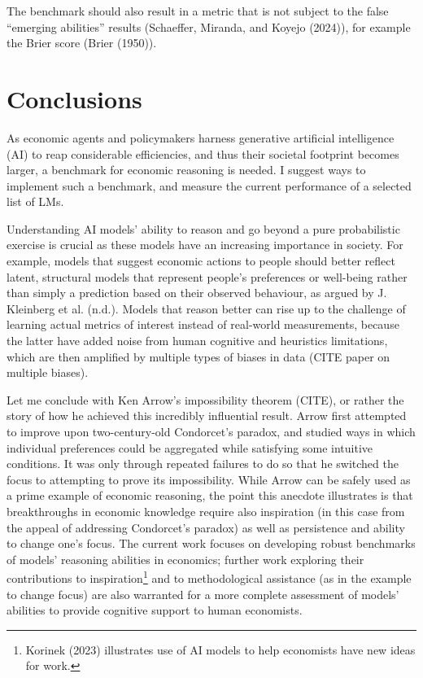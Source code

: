 \documentclass[
]{article}
\begin{document}
The benchmark should also result in a metric that is not subject to the
false ``emerging abilities'' results (Schaeffer, Miranda, and Koyejo
(2024)), for example the Brier score (Brier (1950)).

\section{Conclusions}\label{conclusions}

As economic agents and policymakers harness generative artificial
intelligence (AI) to reap considerable efficiencies, and thus their
societal footprint becomes larger, a benchmark for economic reasoning is
needed. I suggest ways to implement such a benchmark, and measure the
current performance of a selected list of LMs.

Understanding AI models' ability to reason and go beyond a pure
probabilistic exercise is crucial as these models have an increasing
importance in society. For example, models that suggest economic actions
to people should better reflect latent, structural models that represent
people's preferences or well-being rather than simply a prediction based
on their observed behaviour, as argued by J. Kleinberg et al. (n.d.).
Models that reason better can rise up to the challenge of learning
actual metrics of interest instead of real-world measurements, because
the latter have added noise from human cognitive and heuristics
limitations, which are then amplified by multiple types of biases in
data (CITE paper on multiple biases).

Let me conclude with Ken Arrow's impossibility theorem (CITE), or rather
the story of how he achieved this incredibly influential result. Arrow
first attempted to improve upon two-century-old Condorcet's paradox, and
studied ways in which individual preferences could be aggregated while
satisfying some intuitive conditions. It was only through repeated
failures to do so that he switched the focus to attempting to prove its
impossibility. While Arrow can be safely used as a prime example of
economic reasoning, the point this anecdote illustrates is that
breakthroughs in economic knowledge require also inspiration (in this
case from the appeal of addressing Condorcet's paradox) as well as
persistence and ability to change one's focus. The current work focuses
on developing robust benchmarks of models' reasoning abilities in
economics; further work exploring their contributions to
inspiration\footnote{Korinek (2023) illustrates use of AI models to help
  economists have new ideas for work.} and to methodological assistance
(as in the example to change focus) are also warranted for a more
complete assessment of models' abilities to provide cognitive support to
human economists.
\end{document}
